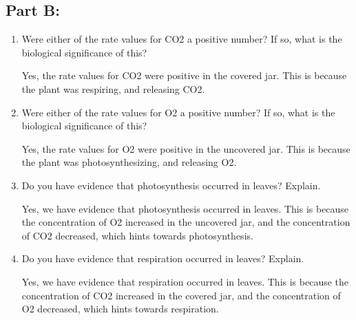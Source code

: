 \documentclass[a4paper, 12pt, english]{article}
\begin{document}
\subsection{Part B:}

\begin{enumerate}
	\item Were either of the rate values for CO2 a positive number? If so, what is the
	      biological significance of this?

	      Yes, the rate values for CO2 were positive in the covered jar. This is because
	      the plant was respiring, and releasing CO2.
	\item Were either of the rate values for O2 a positive number? If so, what is the
	      biological significance of this?

	      Yes, the rate values for O2 were positive in the uncovered jar. This is because
	      the plant was photosynthesizing, and releasing O2.
	\item Do you have evidence that photosynthesis occurred in leaves? Explain.

	      Yes, we have evidence that photosynthesis occurred in leaves. This is because
	      the concentration of O2 increased in the uncovered jar, and the concentration of
		  CO2 decreased, which hints towards photosynthesis.
	\item Do you have evidence that respiration occurred in leaves? Explain.
	
	Yes, we have evidence that respiration occurred in leaves. This is because the
	concentration of CO2 increased in the covered jar, and the concentration of O2
	decreased, which hints towards respiration.
\end{enumerate}
\end{document}
